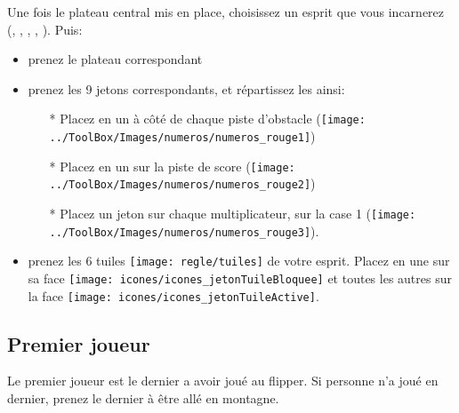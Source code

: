 Une fois le plateau central mis en place, choisissez un esprit que vous incarnerez (\eau, \nature, \foudre, \terre, \vent). Puis:
\begin{itemize}
\item prenez le plateau correspondant
\item prenez les 9 jetons correspondants, et répartissez les ainsi:
\begin{itemize}
\item[*] Placez en un à côté de chaque piste d'obstacle (\texttt{[image: ../ToolBox/Images/numeros/numeros\_rouge1]})
\item[*] Placez en un sur la piste de score (\texttt{[image: ../ToolBox/Images/numeros/numeros\_rouge2]})
\item[*] Placez un jeton sur chaque multiplicateur, sur la case 1 (\texttt{[image: ../ToolBox/Images/numeros/numeros\_rouge3]}).
\end{itemize}
\item prenez les 6 tuiles \texttt{[image: regle/tuiles]} de votre esprit. Placez en une sur sa face \texttt{[image: icones/icones\_jetonTuileBloquee]} et toutes les autres sur la face \texttt{[image: icones/icones\_jetonTuileActive]}.
\end{itemize}
 
\subsection*{Premier joueur}
Le premier joueur est le dernier a avoir joué au flipper. Si personne n'a joué en dernier, prenez le dernier à être allé en montagne.